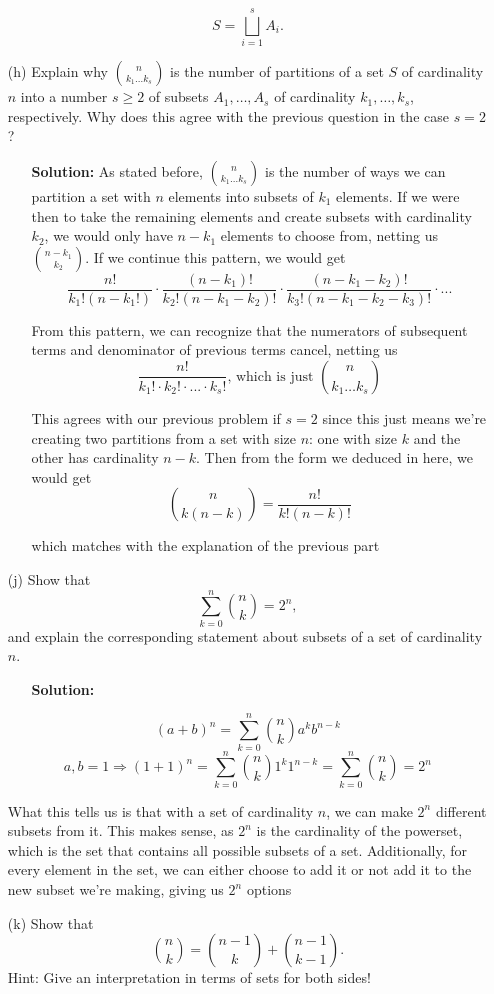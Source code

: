 \documentclass[hidelinks]{article}
\begin{document}
\begin{itemize}
$$S = \bigsqcup_{i=1}^s A_i.$$
    \item[(h)] Explain why $\binom{n}{k_1 \ldots k_s}$ is the number of partitions of a set $S$ of cardinality $n$ into a number $s \geq 2$ of subsets $A_1, \ldots, A_s$ of cardinality $k_1, \ldots, k_s$, respectively. Why does this agree with the previous question in the case $s = 2$?
    \begin{itemize}
        \item[ ] \textbf{Solution:}
        As stated before, $\binom{n}{k_1 \ldots k_s}$ is the number of ways we can partition a set with $n$ elements into subsets of $k_1$ elements. If we were then to take the remaining elements and create subsets with cardinality $k_2$, we would only have $n-k_1$ elements to choose from, netting us $\binom{n-k_1}{k_2 }$. If we continue this pattern, we would get 
    \[
    \frac{n!}{k_1!(n-k_1!)} \cdot \frac{(n - k_1)!}{k_2!(n - k_1 - k_2)!} \cdot \frac{(n - k_1-k_2)!}{k_3!(n - k_1 - k_2 - k_3)!} \cdot ... 
    \]
        \item[ ] From this pattern, we can recognize that the numerators of subsequent terms and denominator of previous terms cancel, netting us 
    \[
        \frac{n!}{k_1! \cdot k_2! \cdot ... \cdot k_s!} \text{, which is just } \binom{n}{k_1 \ldots k_s} 
    \]
    \item[ ] This agrees with our previous problem if $s = 2$ since this just means we're creating two partitions from a set with size $n$: one with size $k$ and the other has cardinality $n - k$. Then from the form we deduced in here, we would get 
    \[
    \binom{n}{k(n-k)} = \frac{n!}{k!(n-k)!}
    \]
\item[ ] which matches with the explanation of the previous part
    \end{itemize}

    \item[(j)] Show that
$$\sum_{k=0}^{n} \binom{n}{k} = 2^n,$$
and explain the corresponding statement about subsets of a set of cardinality $n$.
    \begin{itemize}
        \item[ ] \textbf{Solution:} 
    \end{itemize}
    \[
        (a+b)^n = \sum_{k=0}^{n} \binom{n}{k}a^kb^{n-k}
    \]
    \[
    a, b = 1 \Rightarrow (1 + 1)^n =  \sum_{k=0}^{n} \binom{n}{k}1^k1^{n-k} = \sum_{k=0}^{n} \binom{n}{k} = 2^n 
    \]
    \item[ ] What this tells us is that with a set of cardinality $n$, we can make $2^n$ different subsets from it. This makes sense, as $2^n$ is the cardinality of the powerset, which is the set that contains all possible subsets of a set. Additionally, for every element in the set, we can either choose to add it or not add it to the new subset we're making, giving us $2^n$ options 
    \newpage
    \item[(k)] Show that
$$\binom{n}{k} = \binom{n-1}{k} + \binom{n-1}{k-1}.$$
Hint: Give an interpretation in terms of sets for both sides!


\end{itemize}
\end{document}
